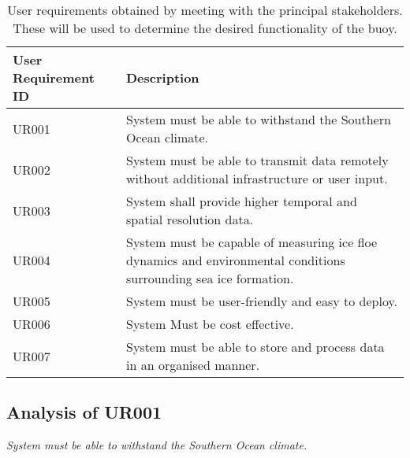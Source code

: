 \begin{table}[H]
  \centering
    \caption{User requirements obtained by meeting with the principal stakeholders. These will be used to determine the desired functionality of the buoy.}
    \small
    \setlength{\extrarowheight}{5pt}
  \begin{tabular}{ >{\centering\arraybackslash} m{} >{\raggedright\arraybackslash} m{} }
  \hline
    \textbf{User Requirement ID} & \textbf{Description} \\
    \hline
    \hline
    UR001 & System must be able to withstand the Southern Ocean climate.\\
    \hline
    UR002 & System must be able to transmit data remotely without additional infrastructure or user input. \\
    \hline
    UR003 & System shall provide higher temporal and spatial resolution data. \\
    \hline
    UR004 & System must be capable of measuring ice floe dynamics and environmental conditions surrounding sea ice formation. \\
    \hline
    UR005 & System must be user-friendly and easy to deploy.\\
    \hline
    UR006 & System Must be cost effective. \\
    \hline
    UR007 & System must be able to store and process data in an organised manner. \\
    \hline
  \end{tabular}

  \label{tab:user_reqs}
\end{table}

\subsection{Analysis of UR001}
\textit{System must be able to withstand the Southern Ocean climate.}

